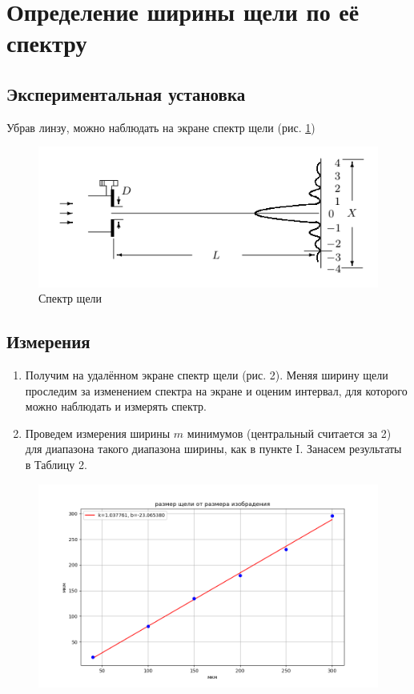 \documentclass[a4paper, 12pt]{article}
\begin{document}
\section*{Определение ширины щели по её спектру}

\subsection*{Экспериментальная установка}

Убрав линзу, можно наблюдать на экране спектр щели (рис. \ref{fig:scheme_II})

\begin{figure}[h]
    \centering
    \includegraphics[width=15cm]{scheme_II.png}
    \caption{Спектр щели}
    \label{fig:scheme_II}
\end{figure}

\newpage

\subsection*{Измерения}

\begin{enumerate}
    \item Получим на удалённом экране спектр щели (рис. 2). Меняя ширину щели проследим за изменением спектра на экране и оценим интервал, для которого можно наблюдать и измерять спектр.
    \item Проведем измерения ширины $m$ минимумов (центральный считается за 2) для диапазона такого диапазона ширины, как в пункте I. Занасем результаты в Таблицу 2. 
\end{enumerate}
\begin{figure}[h!]
	\includegraphics[width = 150mm]{data2}
\end{figure}
\end{document}
